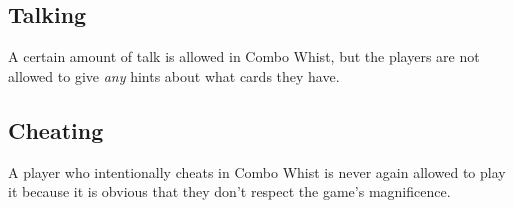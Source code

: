\documentclass[a4paper]{article}
\begin{document}
		\subsection{Talking}
			A certain amount of talk is allowed in Combo Whist, but the players are not allowed to give \emph{any} hints about what cards they have.
		
		\subsection{Cheating}
			A player who intentionally cheats in Combo Whist is never again allowed to play it because it is obvious that they don't respect the game's magnificence.

	\pagebreak
	
	
\end{document}
